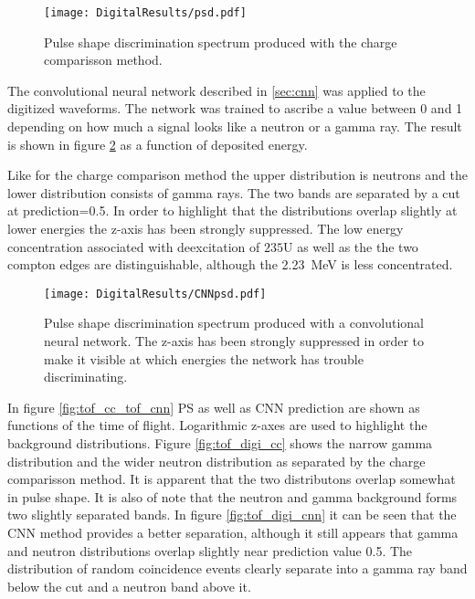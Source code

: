 \documentclass[main.tex]{subfiles}
\begin{document}
\begin{figure}[ht]
    \centering
        \texttt{[image: DigitalResults/psd.pdf]}
        \caption[PSD spectrum, digital setup.]{Pulse shape discrimination spectrum produced with the charge comparisson method.}
        \label{fig:psd_d}
\end{figure}

The convolutional neural network described in \ref{sec:cnn} was applied to the digitized waveforms. The network was trained to ascribe a value between 0 and 1 depending on how much a signal looks like a neutron or a gamma ray. The result is shown in figure \ref{fig:cnn_E} as a function of deposited energy. 

Like for the charge comparison method the upper distribution is neutrons and the lower distribution consists of gamma rays. The two bands are separated by a cut at prediction=0.5. In order to highlight that the distributions overlap slightly at lower energies the z-axis has been strongly suppressed. The low energy concentration associated with deexcitation of $\text{235}$U as well as the the two compton edges are distinguishable, although the \SI{2.23}{\MeV} is less concentrated.

\begin{figure}[ht]
    \centering
        \texttt{[image: DigitalResults/CNNpsd.pdf]}
        \caption[PSD spectrum obtained with CNN]{Pulse shape discrimination spectrum produced with a convolutional neural network. The z-axis has been strongly suppressed in order to make it visible at which energies the network has trouble discriminating.}
    \label{fig:cnn_E} 
\end{figure}

In figure \ref{fig:tof_cc_tof_cnn} PS as well as CNN prediction are shown as functions of the time of flight. Logarithmic z-axes are used to highlight the background distributions. Figure \ref{fig:tof_digi_cc} shows the narrow gamma distribution and the wider neutron distribution as separated by the charge comparisson method. It is apparent that the two distributons overlap somewhat in pulse shape. It is also of note that the neutron and gamma background forms two slightly separated bands.  In figure \ref{fig:tof_digi_cnn} it can be seen that the CNN method provides a better separation, although it still appears that gamma and neutron distributions overlap slightly near prediction value 0.5. The distribution of random coincidence events clearly separate into a gamma ray band below the cut and a neutron band above it.
\end{document}
